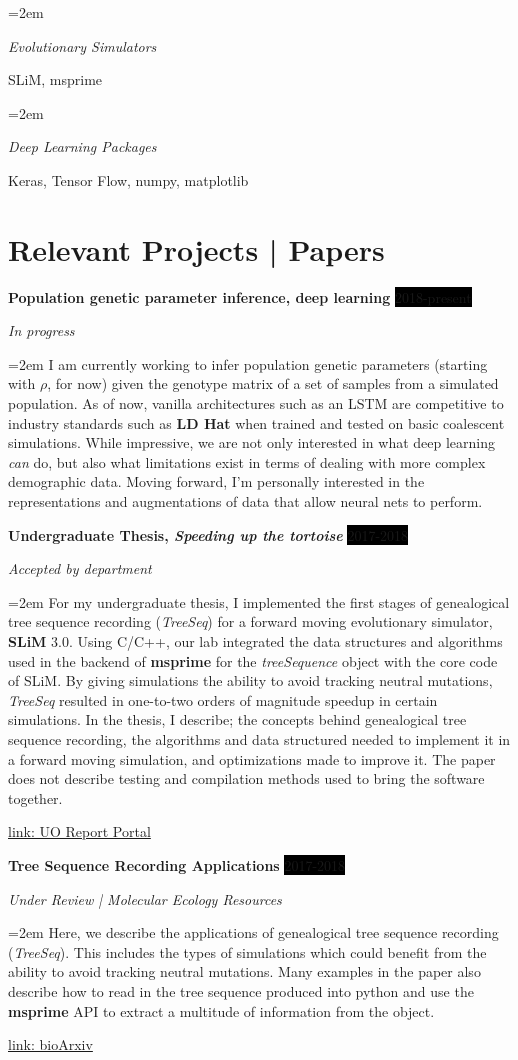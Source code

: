 \documentclass[paper=a4,fontsize=11pt]{scrartcl} %
\newlength{\spacebox}
\newcommand{\sepspace}{\vspace*{1em}}		%
\newcommand{\PersonalEntry}[2]{
		\noindent\hangindent=2em\hangafter=0 %
		\parbox{\spacebox}{        %
		\textit{#1}}		       %
		\hspace{1.5em} #2 \par}    %
\newcommand{\SkillsEntry}[2]{      %
		\noindent\hangindent=2em\hangafter=0 %
		\parbox{\spacebox}{        %
		\textit{#1}}			   %
		\hspace{1.5em} #2 \par}    %
\newcommand{\EducationEntry}[4]{
		\noindent \textbf{#1} \hfill      %
		\colorbox{Black}{%
			\parbox{6em}{%
			\hfill\color{White}#2}} \par  %
		\noindent \textit{#3} \par        %
		\noindent\hangindent=2em\hangafter=0 \small #4 %
		\normalsize \par}
\newcommand{\ProjectEntry}[4]{				  %
		\noindent \textbf{#1} \hfill      %
		\colorbox{Black}{\color{White}#2} \par  %
		\noindent \textit{#3} \par              %
		\noindent\hangindent=2em\hangafter=0 \small #4 %
		\normalsize \par}
\begin{document}
\SkillsEntry{Evolutionary Simulators}{SLiM, msprime}
\sepspace

\SkillsEntry{Deep Learning Packages}{Keras, Tensor Flow, numpy, matplotlib}
\sepspace

\section*{Relevant Projects | Papers}{}
\ProjectEntry{Population genetic parameter inference, deep learning}{2018-present}{In progress}
{I am currently working to infer population genetic parameters (starting with $\rho$, for now) given the
genotype matrix of a set of samples from a simulated population.  As of now, vanilla architectures
such as an LSTM are competitive to industry standards such as \textbf{LD Hat} when trained and tested 
on basic coalescent simulations. While impressive, we are not only interested in what deep learning \textit{can} do, 
but also what limitations exist in terms of dealing with more complex demographic data. Moving forward,
I'm personally interested in the representations and augmentations of data that allow neural nets to perform.

}
\sepspace
\ProjectEntry{Undergraduate Thesis, \textit{Speeding up the tortoise}}{2017-2018}{Accepted by department}
{For my undergraduate thesis, I implemented the first stages of genealogical tree sequence recording (\textit{TreeSeq}) for 
a forward moving evolutionary simulator, \textbf{SLiM} $3.0$.
Using C/C++, our lab integrated the data structures and algorithms used in the backend of \textbf{msprime} for the 
\textit{treeSequence} object with the core code of SLiM. By giving simulations the ability to avoid tracking neutral mutations,
\textit{TreeSeq} resulted in one-to-two orders of magnitude speedup in certain simulations. 
In the thesis, I describe; the concepts behind genealogical tree sequence recording, the algorithms 
and data structured needed to implement it in a forward moving simulation, and optimizations made 
to improve it. The paper does not describe testing and compilation methods used to bring the software together.

}
\href{https://www.cs.uoregon.edu/Reports/UG-201806-Galloway.pdf}{link: UO Report Portal}
\sepspace

\ProjectEntry{Tree Sequence Recording Applications}{2017-2018}{Under Review | Molecular Ecology Resources}
{Here, we describe the applications of genealogical tree sequence recording (\textit{TreeSeq}).
This includes the types of simulations which could benefit from the ability to avoid tracking neutral mutations.
Many examples in the paper also describe how to read in the tree sequence produced into python and use the
\textbf{msprime} API to extract a multitude of information from the object. 

}
\href{https://doi.org/10.1101/407783}{link: bioArxiv}
\sepspace
\end{document}
